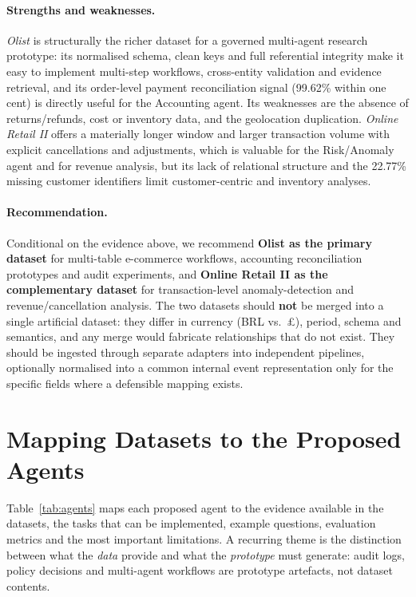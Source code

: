 \documentclass[11pt,a4paper]{article}
\begin{document}
\paragraph{Strengths and weaknesses.}
\emph{Olist} is structurally the richer dataset for a governed multi-agent research prototype: its normalised schema, clean keys and full referential integrity make it easy to implement multi-step workflows, cross-entity validation and evidence retrieval, and its order-level payment reconciliation signal (99.62\% within one cent) is directly useful for the Accounting agent. Its weaknesses are the absence of returns/refunds, cost or inventory data, and the geolocation duplication. \emph{Online Retail II} offers a materially longer window and larger transaction volume with explicit cancellations and adjustments, which is valuable for the Risk/Anomaly agent and for revenue analysis, but its lack of relational structure and the 22.77\% missing customer identifiers limit customer-centric and inventory analyses.

\paragraph{Recommendation.}
Conditional on the evidence above, we recommend \textbf{Olist as the primary dataset} for multi-table e-commerce workflows, accounting reconciliation prototypes and audit experiments, and \textbf{Online Retail II as the complementary dataset} for transaction-level anomaly-detection and revenue/cancellation analysis. The two datasets should \textbf{not} be merged into a single artificial dataset: they differ in currency (BRL vs.\ \pounds), period, schema and semantics, and any merge would fabricate relationships that do not exist. They should be ingested through separate adapters into independent pipelines, optionally normalised into a common internal event representation only for the specific fields where a defensible mapping exists.

\section{Mapping Datasets to the Proposed Agents}
Table~\ref{tab:agents} maps each proposed agent to the evidence available in the datasets, the tasks that can be implemented, example questions, evaluation metrics and the most important limitations. A recurring theme is the distinction between what the \emph{data} provide and what the \emph{prototype} must generate: audit logs, policy decisions and multi-agent workflows are prototype artefacts, not dataset contents.
\end{document}
